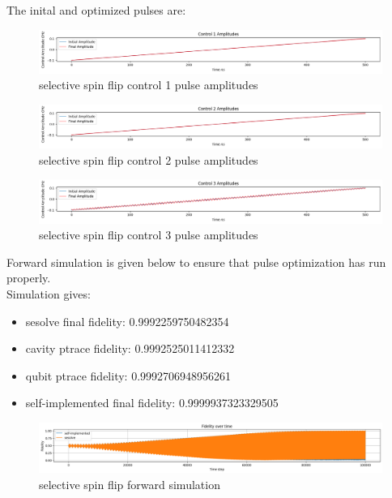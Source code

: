 \documentclass[12pt]{report}
\begin{document}
The inital and optimized pulses are: 
\begin{figure}[H]
    \centering
    \includegraphics[width=0.95\linewidth]{selective_spin_flip_GRAPE_500,_100_000_LIN_constraints_control1.png}
    \caption{selective spin flip control 1 pulse amplitudes}
    \label{fig:selective_spin_flip_constrains_control1}
\end{figure}
\begin{figure}[H]
    \centering
    \includegraphics[width=0.95\linewidth]{selective_spin_flip_GRAPE_500,_100_000_LIN_constraints_control2.png}
    \caption{selective spin flip control 2 pulse amplitudes}
    \label{fig:selective_spin_flip_constrains_control2}
\end{figure}
\begin{figure}[H]
    \centering
    \includegraphics[width=0.95\linewidth]{selective_spin_flip_GRAPE_500,_100_000_LIN_constraints_control3.png}
    \caption{selective spin flip control 3 pulse amplitudes}
    \label{fig:selective_spin_flip_constrains_control3}
\end{figure}

Forward simulation is given below to ensure that pulse optimization has run properly. 
\\
Simulation gives: 
\begin{itemize}
    \item sesolve final fidelity:  0.9992259750482354
    \item cavity ptrace fidelity:  0.9992525011412332
    \item qubit ptrace fidelity:  0.9992706948956261
    \item self-implemented final fidelity:  0.9999937323329505
\end{itemize}
\begin{figure}[H]
    \centering
    \includegraphics[width=0.95\linewidth]{selective_spin_flip_GRAPE_500,_100_000_LIN_constraints_simulation.png}
    \caption{selective spin flip forward simulation}
    \label{fig:selective_spin_flip_constraints_forward_simulation}
\end{figure}
\end{document}
